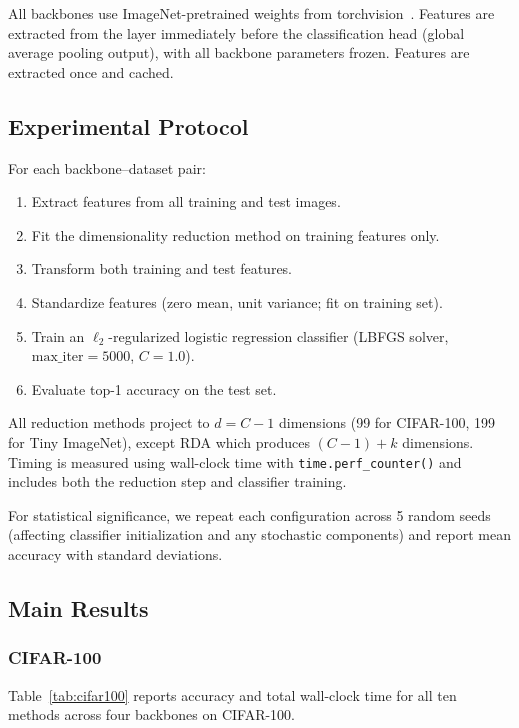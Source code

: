 All backbones use ImageNet-pretrained weights from torchvision~\cite{pytorch}. Features are extracted from the layer immediately before the classification head (global average pooling output), with all backbone parameters frozen. Features are extracted once and cached.

\subsection{Experimental Protocol}

For each backbone--dataset pair:
\begin{enumerate}[leftmargin=*]
    \item Extract features from all training and test images.
    \item Fit the dimensionality reduction method on training features only.
    \item Transform both training and test features.
    \item Standardize features (zero mean, unit variance; fit on training set).
    \item Train an $\ell_2$-regularized logistic regression classifier (LBFGS solver, $\text{max\_iter}=5000$, $C=1.0$).
    \item Evaluate top-1 accuracy on the test set.
\end{enumerate}

All reduction methods project to $d = C - 1$ dimensions (99 for CIFAR-100, 199 for Tiny ImageNet), except RDA which produces $(C-1) + k$ dimensions. Timing is measured using wall-clock time with \texttt{time.perf\_counter()} and includes both the reduction step and classifier training.

For statistical significance, we repeat each configuration across 5 random seeds (affecting classifier initialization and any stochastic components) and report mean accuracy with standard deviations.

\subsection{Main Results}

\subsubsection{CIFAR-100}

Table~\ref{tab:cifar100} reports accuracy and total wall-clock time for all ten methods across four backbones on CIFAR-100.

